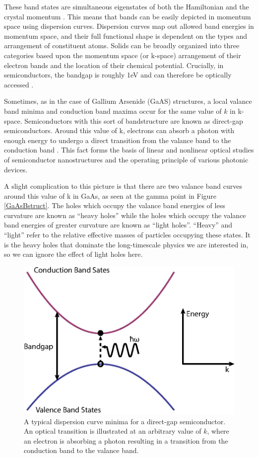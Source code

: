 \indent These band states are simultaneous eigenstates of both the Hamiltonian and the crystal momentum \cite{davies, fox}. This means that bands can be easily depicted in momentum space using dispersion curves. Dispersion curves map out allowed band energies in momentum space, and their full functional shape is dependent on the types and arrangement of constituent atoms.  Solids can be broadly organized into three categories based upon the momentum space (or k-space) arrangement of their electron bands and the location of their chemical potential. Crucially, in semiconductors, the bandgap is roughly 1eV and can therefore be optically accessed \cite{fox}. 

\indent Sometimes, as in the case of Gallium Arsenide (GaAS) structures, a local valance band minima and conduction band maxima occur for the same value of $k$ in k-space. Semiconductors with this sort of bandstructure are known as direct-gap semiconductors. Around this value of k, electrons can absorb a photon with enough energy to undergo a direct transition from the valance band to the conduction band \cite{iadonisi, galanthesis}. This fact forms the basis of linear and nonlinear optical studies of semiconductor nanostructures \cite{stevereview} and the operating principle of various photonic devices.

\indent A slight complication to this picture is that there are two valance band curves around this value of k in GaAs, as seen at the gamma point in Figure \ref{GaAsBstruct}. The holes which occupy the valance band energies of less curvature are known as ``heavy holes'' while the holes which occupy the valance band energies of greater curvature are known as ``light holes''. ``Heavy'' and ``light'' refer to the relative effective masses of particles occupying these states. It is the heavy holes that dominate the long-timescale physics we are interested in, so we can ignore the effect of light holes here. 

\begin{figure}[h]
\centering
\includegraphics[width = .4\textwidth]{dispcurve.eps}
\caption{ \doublespacing A typical dispersion curve minima for a direct-gap semiconductor. An optical transition is illustrated at an arbitrary value of $k$, where an electron is absorbing a photon resulting in a transition from the conduction band to the valance band.}
\label{ExampleBands}
\end{figure}

